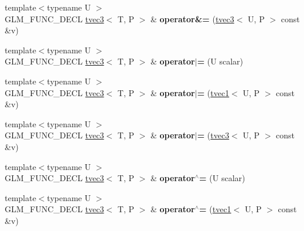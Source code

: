\begin{DoxyCompactItemize}
\item 
\hypertarget{structglm_1_1tvec3_aca1630f439ac6a204ed15f3513c057b1}{{\footnotesize template$<$typename U $>$ }\\G\-L\-M\-\_\-\-F\-U\-N\-C\-\_\-\-D\-E\-C\-L \hyperlink{structglm_1_1tvec3}{tvec3}$<$ T, P $>$ \& {\bfseries operator\&=} (\hyperlink{structglm_1_1tvec3}{tvec3}$<$ U, P $>$ const \&v)}\label{structglm_1_1tvec3_aca1630f439ac6a204ed15f3513c057b1}

\item 
\hypertarget{structglm_1_1tvec3_af7ccac158b76afbc783f3f107396c319}{{\footnotesize template$<$typename U $>$ }\\G\-L\-M\-\_\-\-F\-U\-N\-C\-\_\-\-D\-E\-C\-L \hyperlink{structglm_1_1tvec3}{tvec3}$<$ T, P $>$ \& {\bfseries operator$\vert$=} (U scalar)}\label{structglm_1_1tvec3_af7ccac158b76afbc783f3f107396c319}

\item 
\hypertarget{structglm_1_1tvec3_a2fe619296352d6a5298b63b3d118bbeb}{{\footnotesize template$<$typename U $>$ }\\G\-L\-M\-\_\-\-F\-U\-N\-C\-\_\-\-D\-E\-C\-L \hyperlink{structglm_1_1tvec3}{tvec3}$<$ T, P $>$ \& {\bfseries operator$\vert$=} (\hyperlink{structglm_1_1tvec1}{tvec1}$<$ U, P $>$ const \&v)}\label{structglm_1_1tvec3_a2fe619296352d6a5298b63b3d118bbeb}

\item 
\hypertarget{structglm_1_1tvec3_a81a873ab5ca19d6bf3360a11f65d4f50}{{\footnotesize template$<$typename U $>$ }\\G\-L\-M\-\_\-\-F\-U\-N\-C\-\_\-\-D\-E\-C\-L \hyperlink{structglm_1_1tvec3}{tvec3}$<$ T, P $>$ \& {\bfseries operator$\vert$=} (\hyperlink{structglm_1_1tvec3}{tvec3}$<$ U, P $>$ const \&v)}\label{structglm_1_1tvec3_a81a873ab5ca19d6bf3360a11f65d4f50}

\item 
\hypertarget{structglm_1_1tvec3_a33635853bb12dc0ff6e828a805a20141}{{\footnotesize template$<$typename U $>$ }\\G\-L\-M\-\_\-\-F\-U\-N\-C\-\_\-\-D\-E\-C\-L \hyperlink{structglm_1_1tvec3}{tvec3}$<$ T, P $>$ \& {\bfseries operator$^\wedge$=} (U scalar)}\label{structglm_1_1tvec3_a33635853bb12dc0ff6e828a805a20141}

\item 
\hypertarget{structglm_1_1tvec3_a5dd85e96e456dee71a1e62bfed87aaf5}{{\footnotesize template$<$typename U $>$ }\\G\-L\-M\-\_\-\-F\-U\-N\-C\-\_\-\-D\-E\-C\-L \hyperlink{structglm_1_1tvec3}{tvec3}$<$ T, P $>$ \& {\bfseries operator$^\wedge$=} (\hyperlink{structglm_1_1tvec1}{tvec1}$<$ U, P $>$ const \&v)}\label{structglm_1_1tvec3_a5dd85e96e456dee71a1e62bfed87aaf5}


\end{DoxyCompactItemize}
